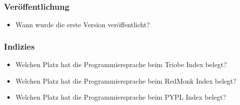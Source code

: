 \subsubsection{Veröffentlichung}
\begin{itemize}
	\item Wann wurde die erste Version veröffentlicht?
\end{itemize}

\subsubsection{Indizies}
\begin{itemize}
	\item Welchen Platz hat die Programmiersprache beim Triobe Index belegt?
	\item Welchen Platz hat die Programmiersprache beim RedMonk Index belegt?
	\item Welchen Platz hat die Programmiersprache beim \gls{PYPL} Index belegt?
\end{itemize}
 
